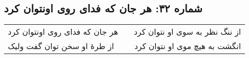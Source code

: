 \begin{center}
\section*{شماره ۳۲: هر جان که فدای روی اونتوان کرد}
\label{sec:032}
\begin{longtable}{l p{0.5cm} r}
هر جان که فدای روی اونتوان کرد
&&
از ننگ نظر به سوی او نتوان کرد
\\
از طرهٔ او سخن توان گفت ولیک
&&
انگشت به هیچ موی او نتوان کرد
\\
\end{longtable}
\end{center}
